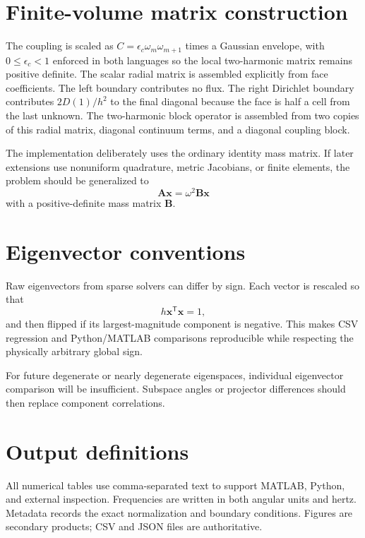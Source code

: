\documentclass[11pt]{article}
\begin{document}
\section{Finite-volume matrix construction}
The coupling is scaled as $C=\epsilon_c\omega_m\omega_{m+1}$ times a Gaussian envelope, with $0\le\epsilon_c<1$ enforced in both languages so the local two-harmonic matrix remains positive definite. The scalar radial matrix is assembled explicitly from face coefficients. The left boundary contributes no flux. The right Dirichlet boundary contributes $2D(1)/h^2$ to the final diagonal because the face is half a cell from the last unknown. The two-harmonic block operator is assembled from two copies of this radial matrix, diagonal continuum terms, and a diagonal coupling block.

The implementation deliberately uses the ordinary identity mass matrix. If later extensions use nonuniform quadrature, metric Jacobians, or finite elements, the problem should be generalized to
\begin{equation}
\mathbf A\mathbf x=\omega^2\mathbf B\mathbf x
\end{equation}
with a positive-definite mass matrix $\mathbf B$.

\section{Eigenvector conventions}
Raw eigenvectors from sparse solvers can differ by sign. Each vector is rescaled so that
\begin{equation}
h\mathbf x^{\mathsf T}\mathbf x=1,
\end{equation}
and then flipped if its largest-magnitude component is negative. This makes CSV regression and Python/MATLAB comparisons reproducible while respecting the physically arbitrary global sign.

For future degenerate or nearly degenerate eigenspaces, individual eigenvector comparison will be insufficient. Subspace angles or projector differences should then replace component correlations.

\section{Output definitions}
All numerical tables use comma-separated text to support MATLAB, Python, and external inspection. Frequencies are written in both angular units and hertz. Metadata records the exact normalization and boundary conditions. Figures are secondary products; CSV and JSON files are authoritative.
\end{document}
